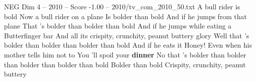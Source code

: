 \begin{textsample}{NEG Dim 4 – 2010 – Score -1.00 – 2010/tv\_com\_2010\_50.txt}  \label{ex:f4_neg_042}
A bull rider is bold Now a bull rider on a plane Is bolder than bold And if he jumps from that plane That 's bolder than bolder than bold And if he jumps while eating a Butterfinger bar And all its crispity, crunchity, peanut buttery glory Well that 's bolder than bolder than bolder than bold And if he eats it Honey!
Even when his mother tells him not to You 'll spoil your \textbf{dinner} No that 's bolder than bolder than bolder than bolder than bold Bolder than bold Crispity, crunchity, peanut buttery

\end{textsample}
